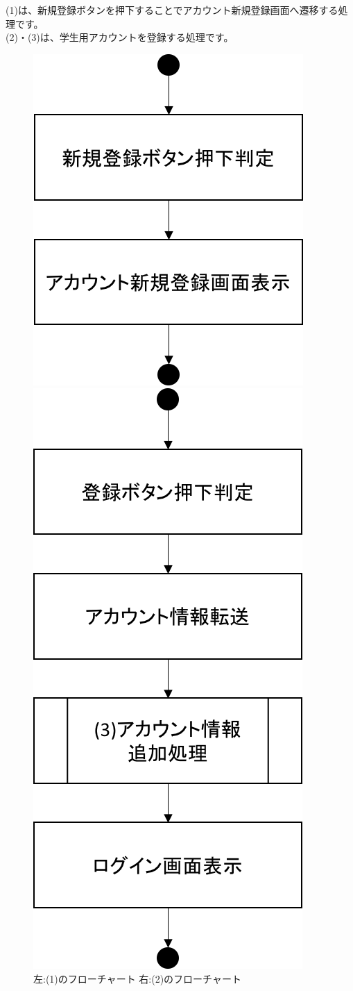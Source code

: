 (1)は、新規登録ボタンを押下することでアカウント新規登録画面へ遷移する処理です。\\
(2)・(3)は、学生用アカウントを登録する処理です。


\begin{figure}[htbp]
 \begin{minipage}{0.5\hsize}
  \begin{center}
   \includegraphics[width=0.5\linewidth,clip]{./img/flow/1.png}
  \end{center}
 \end{minipage}
 \begin{minipage}{0.5\hsize}
  \begin{center}
   \includegraphics[width=0.5\linewidth,clip]{./img/flow/2.png}
  \end{center}
 \end{minipage}
 \caption{左:(1)のフローチャート 右:(2)のフローチャート}\label{fig:1to2}
\end{figure}

